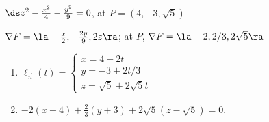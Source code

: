{$\ds z^2-\frac{x^2}{4} - \frac{y^2}9=0$, at $P = (4,-3,\sqrt{5})$
}
{
$\nabla F = \la -\frac x2, -\frac{2y}9,2z \ra$; at $P$, $\nabla F = \la -2, 2/3, 2\sqrt{5}\ra$
\begin{enumerate}
	\item $\ell_{\vec n}(t) = \left\{\begin{array}{l} x= 4-2t \\ y = -3+ 2t/3\\ z = \sqrt{5} + 2\sqrt{5}t \end{array}\right.$
	\item		$-2(x-4) + \frac23(y+3) + 2\sqrt{5}(z-\sqrt{5}) = 0$.
\end{enumerate}
}